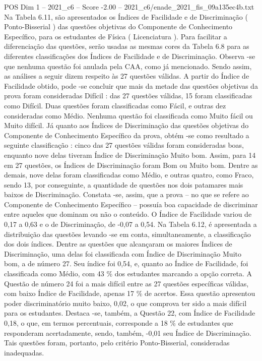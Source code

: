 \begin{textsample}{POS Dim 1 – 2021\_c6 – Score -2.00 – 2021\_c6/enade\_2021\_fis\_09a135ec4b.txt}
Na Tabela 6.11, são apresentados os Índices de Facilidade e de Discriminação ( Ponto-Bisserial ) das questões objetivas do Componente de Conhecimento Específico, para os estudantes de Física ( Licenciatura ).
Para facilitar a diferenciação das questões, serão usadas as mesmas cores da Tabela 6.8 para as diferentes classificações dos Índices de Facilidade e de Discriminação.
Observa -se que nenhuma questão foi anulada pela CAA, como já mencionado.
Sendo assim, as análises a seguir dizem respeito às 27 questões válidas.
A partir do Índice de Facilidade obtido, pode -se concluir que mais da metade das questões objetivas da prova foram consideradas Difícil : das 27 questões válidas, 15 foram classificadas como Difícil.
Duas questões foram classificadas como Fácil, e outras dez consideradas como Médio.
Nenhuma questão foi classificada como Muito fácil ou Muito difícil.
Já quanto aos Índices de Discriminação das questões objetivas do Componente de Conhecimento Específico da prova, obtém -se como resultado a seguinte classificação : cinco das 27 questões válidas foram consideradas boas, enquanto nove delas tiveram Índice de Discriminação Muito bom.
Assim, para 14 em 27 questões, os Índices de Discriminação foram Bom ou Muito bom.
Dentre as demais, nove delas foram classificadas como Médio, e outras quatro, como Fraco, sendo 13, por conseguinte, a quantidade de questões nos dois patamares mais baixos de Discriminação.
Constata -se, assim, que a prova – no que se refere ao Componente de Conhecimento Específico – possuía boa capacidade de discriminar entre aqueles que dominam ou não o conteúdo.
O Índice de Facilidade variou de 0,17 a 0,63 e o de Discriminação, de -0,07 a 0,54.
Na Tabela 6.12, é apresentada a distribuição das questões levando -se em conta, simultaneamente, a classificação dos dois índices.
Dentre as questões que alcançaram os maiores Índices de Discriminação, uma delas foi classificada com Índice de Discriminação Muito bom, a de número 27.
Seu índice foi 0,54, e, quanto ao Índice de Facilidade, foi classificada como Médio, com 43 \% dos estudantes marcando a opção correta.
A Questão de número 24 foi a mais difícil entre as 27 questões específicas válidas, com baixo Índice de Facilidade, apenas 17 \% de acertos.
Essa questão apresentou poder discriminatório muito baixo, 0,02, o que comprova ter sido a mais difícil para os estudantes.
Destaca -se, também, a Questão 22, com Índice de Facilidade 0,18, o que, em termos percentuais, corresponde a 18 \% de estudantes que responderam acertadamente, sendo, também, -0,01 seu Índice de Discriminação.
Tais questões foram, portanto, pelo critério Ponto-Bisserial, consideradas inadequadas.

\end{textsample}
